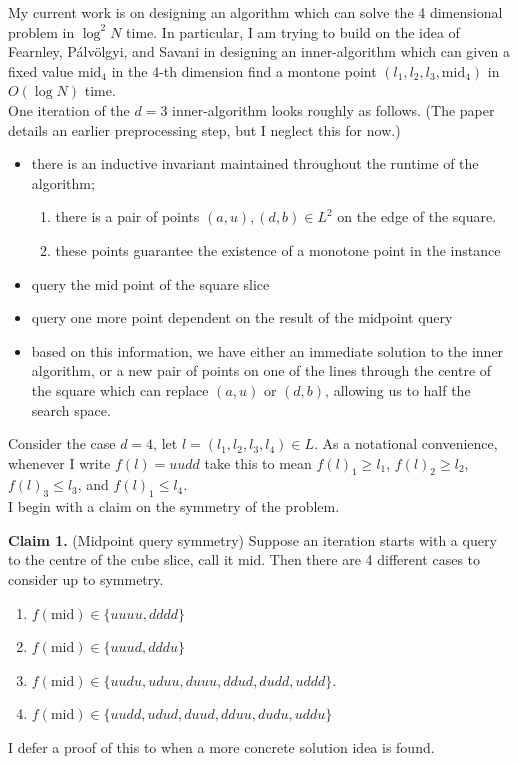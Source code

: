 \documentclass{article}
\newcommand{\mi}{\text{mid}}
\newcommand{\pav}{Pálvölgyi}
\begin{document}
  My current work is on designing an algorithm which can solve the 4 dimensional problem in $\log^2 N$ time.
  In particular, I am trying to build on the idea of Fearnley, \pav, and Savani in designing an inner-algorithm
  which can given a fixed value $\mi_4$ in the 4-th dimension find a montone point 
  $(l_1, l_2, l_3, \mi_4)$ in $O(\log N)$ time. \\

  One iteration of the $d=3$ inner-algorithm looks roughly as follows. (The paper details an earlier preprocessing step,
  but I neglect this for now.)
  \begin{itemize}
    \item there is an inductive invariant maintained throughout the runtime of the algorithm;
      \begin{enumerate}
        \item there is a pair of points $(a, u), (d, b) \in L^2$ on the edge of the square.
        \item these points guarantee the existence of a monotone point in the instance
      \end{enumerate}
    \item query the mid point of the square slice
    \item query one more point dependent on the result of the midpoint query
    \item based on this information, we have either an immediate solution to the
      inner algorithm, or a new pair of points on one of the lines through
      the centre of the square which can replace $(a, u)$ or $(d, b)$, allowing
      us to half the search space.
  \end{itemize}



  Consider the case $d=4$, let $l = (l_1, l_2, l_3, l_4) \in L$. 
  As a notational convenience, whenever I write $f(l) = uudd$ take
  this to mean $f(l)_1 \geq l_1$, $f(l)_2 \geq l_2$, $f(l)_3 \leq l_3$, and $f(l)_1 \leq l_4$.  \\

  I begin with a claim on the symmetry of the problem. \\

  \newpage

  \textbf{Claim 1.} (Midpoint query symmetry) Suppose an iteration starts with a query to the centre of the
  cube slice, call it $\mi$. Then there are 4 different cases to consider up to symmetry.
  \begin{enumerate}
    \item $f(\mi) \in \{ uuuu, dddd \}$
    \item $f(\mi) \in \{ uuud, dddu \}$
    \item $f(\mi) \in \{ uudu, uduu, duuu, ddud, dudd, uddd \}$.
    \item $f(\mi) \in \{ uudd, udud, duud, dduu, dudu, uddu \}$
  \end{enumerate}
  I defer a proof of this to when a more concrete solution idea is found. \\
\end{document}
